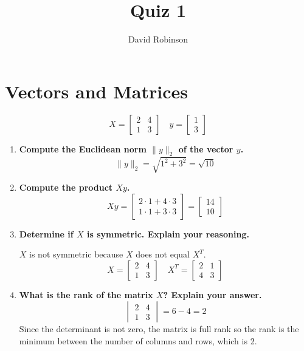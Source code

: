 \documentclass{article}
\title{Quiz 1}
\author{David Robinson}
\date{}
\begin{document}
\maketitle

\section*{Vectors and Matrices}

\[X=\begin{bmatrix}
    2 & 4 \\ 1 & 3
\end{bmatrix}\quad y=\begin{bmatrix}
    1 \\ 3
\end{bmatrix}\]

\begin{enumerate}
    \item \textbf{Compute the Euclidean norm $\|y\|_2$ of the vector $y$.}
    \[\|y\|_2 = \sqrt{1^2+3^2} = \sqrt{10}\]
    \item \textbf{Compute the product $Xy$.}
    \[Xy=\begin{bmatrix}
        2\cdot 1 + 4 \cdot 3 \\ 1\cdot 1 + 3\cdot 3
    \end{bmatrix}=\begin{bmatrix}
        14 \\ 10
    \end{bmatrix}\]
    \item \textbf{Determine if $X$ is symmetric. Explain your reasoning.}
    
    $X$ is not symmetric because $X$ does not equal $X^T$.
    \[X=\begin{bmatrix}
        2 & 4 \\ 1 & 3
    \end{bmatrix}\quad X^T=\begin{bmatrix}
        2 & 1 \\ 4 & 3
    \end{bmatrix}\]
    \item \textbf{What is the rank of the matrix $X$? Explain your answer.}
    \[\begin{vmatrix}
        2 & 4 \\ 1 & 3
    \end{vmatrix}=6-4=2\]
    Since the determinant is not zero, the matrix is full rank so the rank is the minimum between the number of columns and rows, which is 2.
\end{enumerate}
\end{document}
